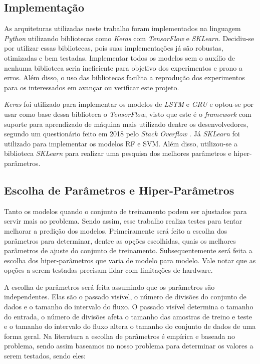 \subsection{Implementação}

As arquiteturas utilizadas neste trabalho foram implementados na linguagem \textit{Python} utilizando bibliotecas como \textit{Keras} com \textit{TensorFlow} e \textit{SKLearn}. Decidiu-se por utilizar essas bibliotecas, pois suas implementações já são robustas, otimizadas e bem testadas. Implementar todos os modelos sem o auxílio de nenhuma biblioteca seria ineficiente para objetivo dos experimentos e prono a erros. Além disso, o uso das bibliotecas facilita a reprodução dos experimentos para os interessados em avançar ou verificar este projeto.

\textit{Keras} foi utilizado para implementar os modelos de \textit{\acrshort{LSTM}} e \textit{\acrshort{GRU}} e optou-se por usar como base dessa biblioteca o \textit{TensorFlow}, visto que este é o \textit{framework} com suporte para aprendizado de máquina mais utilizado dentre os desenvolvedores, segundo um questionário feito em 2018 pelo \textit{Stack Overflow} \cite{stack_2018}. Já \textit{SKLearn} foi utilizado para implementar os modelos \acrshort{RF} e \acrshort{SVM}. Além disso, utilizou-se a biblioteca \textit {SKLearn} para realizar uma pesquisa dos melhores parâmetros e hiper-parâmetros.

\subsection{Escolha de Parâmetros e Hiper-Parâmetros}

Tanto os modelos quando o conjunto de treinamento podem ser ajustados para servir mais ao problema. Sendo assim, esse trabalho realiza testes para tentar melhorar a predição dos modelos. Primeiramente será feito a escolha dos parâmetros para determinar, dentre as opções escolhidas, quais os melhores parâmetros de ajuste do conjunto de treinamento. Subsequentemente será feita a escolha dos hiper-parâmetros que varia de modelo para modelo. Vale notar que as opções a serem testadas precisam lidar com limitações de hardware.

A escolha de parâmetros será feita assumindo que os parâmetros são independentes. Elas são o passado visível, o número de divisões do conjunto de dados e o tamanho do intervalo do fluxo. O passado visível determina o tamanho do entrada, o número de divisões afeta o tamanho das amostras de treino e teste e o tamanho do intervalo do fluxo altera o tamanho do conjunto de dados de uma forma geral. Na literatura a escolha de parâmetros é empírica e baseada no problema, sendo assim baseamos no nosso problema para determinar os valores a serem testados, sendo eles:

